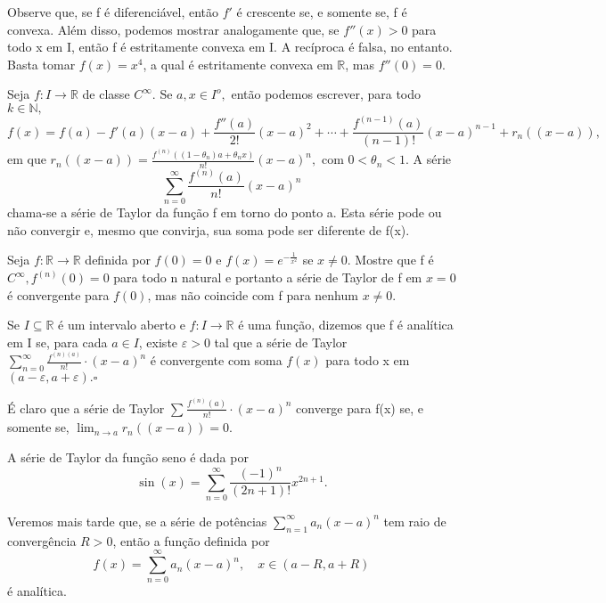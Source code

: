 \documentclass[Analysis/analysis_notes.tex]{subfiles}
\begin{document}
Observe que, se f é diferenciável, então \(f'\) é crescente se, e somente se,
f é convexa. Além disso, podemos mostrar analogamente que, se \(f''(x) > 0\) para
todo x em I, então f é estritamente convexa em I. A recíproca é falsa, no entanto.
Basta tomar \(f(x) = x^{4}\), a qual é estritamente convexa em \(\mathbb{R}\), mas
\(f''(0) = 0.\)

Seja \(f:I\rightarrow \mathbb{R}\) de classe \(C^{\infty}.\) Se \(a, x\in I^{o},\) então
podemos escrever, para todo \(k\in \mathbb{N},\)
\[
	f(x) = f(a) - f'(a)(x-a) + \frac{f''(a)}{2!}(x-a)^{2} + \cdots + \frac{f^{(n-1)}(a)}{(n-1)!}(x-a)^{n-1} + r_{n}((x-a)),
\]
em que \(r_{n}((x-a))=\frac{f^{(n)}((1-\theta_{n})a+\theta_{n}x)}{n!}(x-a)^{n},\) com
\(0 < \theta_{n} < 1.\) A série
\[
	\sum\limits_{n=0}^{\infty}\frac{f^{(n)}(a)}{n!}(x-a)^{n}
\]
chama-se a série de Taylor da fun\c cão f em torno do ponto a. Esta série
pode ou não convergir e, mesmo que convirja, sua soma pode ser diferente
de f(x).
\begin{example}
	Seja \(f:\mathbb{R}\rightarrow \mathbb{R}\) definida por \(f(0)=0\) e
	\(f(x)=e^{-\frac{1}{x^{2}}}\) se \(x\neq0.\) Mostre que f é \(C^{\infty}, f^{(n)}(0)=0\)
	para todo n natural e portanto a série de Taylor de f em \(x=0\) é convergente para
	\(f(0)\), mas não coincide com f para nenhum \(x\neq0.\)
\end{example}
\begin{def*}
	Se \(I\subseteq{\mathbb{R}}\) é um intervalo aberto e \(f:I\rightarrow \mathbb{R}\)
	é uma fun\c cão, dizemos que f é analítica em I se, para cada \(a\in I\), existe
	\(\varepsilon >0\) tal que a série de Taylor \(\sum\limits_{n=0}^{\infty}\frac{f^{(n)(a)}}{n!}\cdot (x-a)^{n}\)
	é convergente com soma \(f(x)\) para todo x em \((a-\varepsilon, a+\varepsilon ).\square\)
\end{def*}
É claro que a série de Taylor \(\sum\limits_{}^{}\frac{f^{(n)}(a)}{n!}\cdot (x-a)^{n}\) converge
para f(x) se, e somente se, \(\lim_{n\to a}r_{n}((x-a))=0.\)
\begin{example}
	A série de Taylor da fun\c cão seno é dada por
	\[
		\sin{(x)} = \sum\limits_{n=0}^{\infty}\frac{(-1)^{n}}{(2n+1)!}x^{2n+1}.
	\]
\end{example}
Veremos mais tarde que, se a série de potências \(\sum\limits_{n=1}^{\infty}a_{n}(x-a)^{n}\)
tem raio de convergência \(R>0\), então a fun\c cão definida por
\[
	f(x) = \sum\limits_{n=0}^{\infty}a_{n}(x-a)^{n}, \quad x\in(a-R, a+R)
\]
é analítica.
\end{document}
